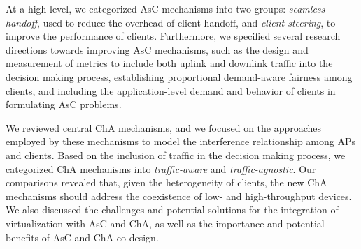 At a high level, we categorized AsC mechanisms into two groups: \textit{seamless handoff}, used to reduce the overhead of client handoff, and \textit{client steering}, to improve the performance of clients.
Furthermore, we specified several research directions towards improving AsC mechanisms, such as the design and measurement of metrics to include both uplink and downlink traffic into the decision making process, establishing proportional demand-aware fairness among clients, and including the application-level demand and behavior of clients in formulating AsC problems.



We reviewed central ChA mechanisms, and we focused on the approaches employed by these mechanisms to model the interference relationship among APs and clients.
Based on the inclusion of traffic in the decision making process, we categorized ChA mechanisms into \textit{traffic-aware} and \textit{traffic-agnostic}.
Our comparisons revealed that, given the heterogeneity of clients, the new ChA mechanisms should address the coexistence of low- and high-throughput devices.
We also discussed the challenges and potential solutions for the integration of virtualization with AsC and ChA, as well as the importance and potential benefits of AsC and ChA co-design.



